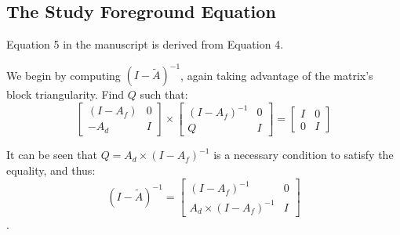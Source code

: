 \subsection{The Study Foreground Equation}

Equation 5 in the manuscript is derived from Equation 4.

We begin by computing $(I-\tilde{A})^{-1}$, again taking advantage of the matrix's block triangularity.  Find $Q$ such that:
\begin{equation}
  \left[\begin{array}{cc} (I-A_f) & 0 \\ -A_d & I\end{array}\right]\times
  \left[\begin{array}{cc} (I-A_f)^{-1} & 0 \\ Q & I\end{array}\right] =
  \left[\begin{array}{cc} I & 0 \\ 0 & I\end{array}\right]
\end{equation}

It can be seen that $Q=A_d\times(I-A_f)^{-1}$ is a necessary condition to satisfy the equality, and thus:
\begin{equation}
  (I-\tilde{A})^{-1} = \left[\begin{array}{cc} (I-A_f)^{-1} & 0 \\ A_d\times(I-A_f)^{-1} & I\end{array}\right]
\end{equation}.

